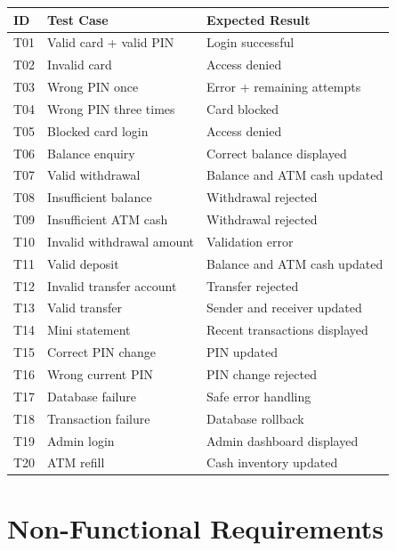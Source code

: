\documentclass[12pt,a4paper]{article}
\begin{document}
\begin{longtable}{p{} p{} p{}}
\toprule
\textbf{ID} & \textbf{Test Case} & \textbf{Expected Result} \\
\midrule
T01 & Valid card + valid PIN & Login successful \\
T02 & Invalid card & Access denied \\
T03 & Wrong PIN once & Error + remaining attempts \\
T04 & Wrong PIN three times & Card blocked \\
T05 & Blocked card login & Access denied \\
T06 & Balance enquiry & Correct balance displayed \\
T07 & Valid withdrawal & Balance and ATM cash updated \\
T08 & Insufficient balance & Withdrawal rejected \\
T09 & Insufficient ATM cash & Withdrawal rejected \\
T10 & Invalid withdrawal amount & Validation error \\
T11 & Valid deposit & Balance and ATM cash updated \\
T12 & Invalid transfer account & Transfer rejected \\
T13 & Valid transfer & Sender and receiver updated \\
T14 & Mini statement & Recent transactions displayed \\
T15 & Correct PIN change & PIN updated \\
T16 & Wrong current PIN & PIN change rejected \\
T17 & Database failure & Safe error handling \\
T18 & Transaction failure & Database rollback \\
T19 & Admin login & Admin dashboard displayed \\
T20 & ATM refill & Cash inventory updated \\
\bottomrule
\end{longtable}


\section{Non-Functional Requirements}
\end{document}
